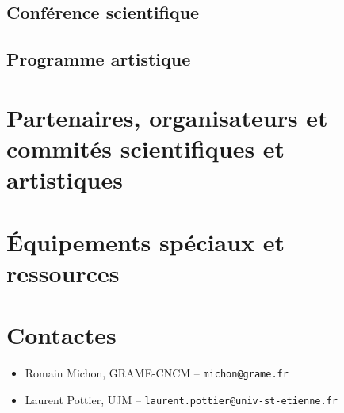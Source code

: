 \documentclass[fontsize=12pt]{scrartcl} %
\numberwithin{equation}{section} %
\numberwithin{figure}{section} %
\numberwithin{table}{section} %
\begin{document}
\subsection{Conférence scientifique}

\subsection{Programme artistique}

\section{Partenaires, organisateurs et commités scientifiques et artistiques}

\section{Équipements spéciaux et ressources}

\section{Contactes}

\begin{itemize}
\item Romain Michon, GRAME-CNCM -- \texttt{michon@grame.fr}
\item Laurent Pottier, UJM -- \texttt{laurent.pottier@univ-st-etienne.fr}
\end{itemize}
\end{document}
